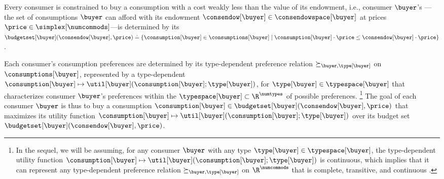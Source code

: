 Every consumer is constrained to buy a consumption with a cost weakly less than the value of its endowment, i.e., consumer $\buyer$'s ---the set of consumptions $\buyer$ can afford with its endowment $\consendow[\buyer] \in \consendowspace[\buyer]$ at prices $\price \in \simplex[\numcommods]$---is determined by its  $\budgetset[\buyer] (\consendow[\buyer], \price) \doteq \{\consumption[\buyer] \in \consumptions[\buyer] \mid  \consumption[\buyer] \cdot \price \leq \consendow[\buyer] \cdot \price \}$.

Each consumer's consumption preferences are determined by its type-dependent preference relation $\succeq_{\buyer, \type[\buyer]}$ on $\consumptions[\buyer]$, represented by a type-dependent  $\consumption[\buyer] \mapsto \util[\buyer] (\consumption[\buyer]; \type[\buyer])$, for  $\type[\buyer] \in \typespace[\buyer]$ that characterizes consumer $\buyer$'s preferences within the  $\typespace[\buyer] \subset \R^{\numtypes}$ of possible preferences.%
\footnote{In the sequel, we will be assuming, for any consumer $\buyer$ with any type $\type[\buyer] \in \typespace[\buyer]$, the type-dependent utility function $\consumption[\buyer] \mapsto \util[\buyer] (\consumption[\buyer]; \type[\buyer])$ is continuous, which implies that it can represent any type-dependent preference relation $\succeq_{\buyer, \type[\buyer]}$ on $\R^\numcommods$ that is complete, transitive, and continuous \cite{debreu1954representation}.}
The goal of each consumer $\buyer$ is thus to buy a consumption $\consumption[\buyer] \in \budgetset[\buyer] (\consendow[\buyer], \price)$ that maximizes its utility function $\consumption[\buyer] \mapsto \util[\buyer] (\consumption[\buyer]; \type[\buyer])$ over its budget set $\budgetset[\buyer] (\consendow[\buyer], \price)$.



